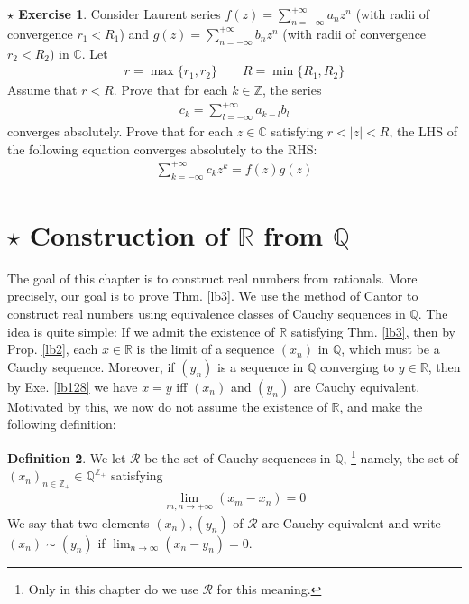 \documentclass[12pt,b5paper,notitlepage]{article}
\theoremstyle{definition}
\newtheorem{df}{Definition}[section]
\newtheorem{sexe}[df]{$\star$ Exercise}
\theoremstyle{plain}
\newcommand{\scr}{\mathscr}
\newcommand{\Cbb}{\mathbb C}
\newcommand{\Zbb}{\mathbb Z}
\newcommand{\Qbb}{\mathbb Q}
\newcommand{\Rbb}{\mathbb R}
\numberwithin{equation}{section}
\begin{document}
\begin{sexe}\label{lb154}
Consider Laurent series $f(z)=\sum_{n=-\infty}^{+\infty}a_nz^n$ (with radii of convergence $r_1<R_1$) and $g(z)=\sum_{n=-\infty}^{+\infty}b_nz^n$ (with radii of convergence $r_2<R_2$) in $\Cbb$. Let
\begin{align*}
r=\max\{r_1,r_2\}\qquad R=\min\{R_1,R_2\}
\end{align*}
Assume that $r<R$. Prove that for each $k\in\Zbb$, the series
\begin{align*}
c_k=\sum_{l=-\infty}^{+\infty}a_{k-l}b_l
\end{align*}
converges absolutely. Prove that for each $z\in\Cbb$ satisfying $r<|z|<R$, the LHS of the following equation converges absolutely to the RHS:
\begin{align}
\sum_{k=-\infty}^{+\infty}c_kz^k= f(z)g(z)
\end{align}
\end{sexe}





\newpage


\section{$\star$ Construction of $\Rbb$ from $\Qbb$}  \label{lb167}


The goal of this chapter is to construct real numbers from rationals. More precisely, our goal is to prove Thm. \ref{lb3}. We use the method of Cantor to construct real numbers using equivalence classes of Cauchy sequences in $\Qbb$. The idea is quite simple: If we admit the existence of $\Rbb$ satisfying Thm. \ref{lb3}, then by Prop. \ref{lb2}, each $x\in\Rbb$ is the limit of a sequence $(x_n)$ in $\Qbb$, which must be a Cauchy sequence. Moreover, if $(y_n)$ is a sequence in $\Qbb$ converging to $y\in\Rbb$, then by Exe. \ref{lb128} we have $x=y$ iff $(x_n)$ and $(y_n)$ are Cauchy equivalent. Motivated by this, we now do not assume the existence of $\Rbb$, and make the following definition:

\begin{df}
We let $\scr R$ be the set of Cauchy sequences in $\Qbb$, \footnote{Only in this chapter do we use $\scr R$ for this meaning.} namely, the set of $(x_n)_{n\in\Zbb_+}\in\Qbb^{\Zbb_+}$ satisfying 
\begin{align*}
\lim_{m,n\rightarrow+\infty} (x_m-x_n)=0
\end{align*}
We say that two elements $(x_n),(y_n)$ of $\scr R$ are Cauchy-equivalent and write $(x_n)\sim(y_n)$ if $\lim_{n\rightarrow\infty}(x_n-y_n)=0$.
\end{df}
\end{document}
